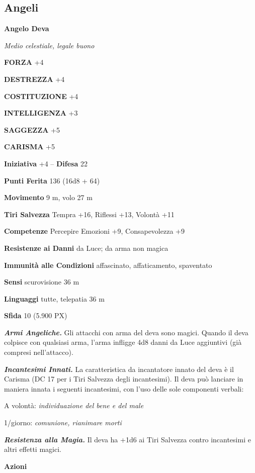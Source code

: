 \begin{multicols}{2}
	\subsection{Angeli}

	\medskip{}\textbf{Angelo Deva}

	\textit{Medio celestiale, legale buono}

	\textbf{FORZA} +4

	\textbf{DESTREZZA} +4

	\textbf{COSTITUZIONE} +4

	\textbf{INTELLIGENZA} +3

	\textbf{SAGGEZZA} +5

	\textbf{CARISMA} +5

	\textbf{Iniziativa} +4 -- \textbf{Difesa} 22

	\textbf{Punti Ferita} 136 (16d8 + 64)

	\textbf{Movimento} 9 m, volo 27 m

	\textbf{Tiri Salvezza} Tempra +16, Riflessi +13, Volontà +11

	\textbf{Competenze} Percepire Emozioni +9, Consapevolezza +9

	\textbf{Resistenze ai Danni} da Luce; da arma non magica

	\textbf{Immunità alle Condizioni} affascinato, affaticamento, spaventato

	\textbf{Sensi} scurovisione 36 m

	\textbf{Linguaggi} tutte, telepatia 36 m

	\textbf{Sfida} 10 (5.900 PX)

	\textit{\textbf{Armi Angeliche.}} Gli attacchi con arma del deva sono magici. Quando il deva colpisce con qualsiasi arma, l'arma infligge 4d8 danni da Luce aggiuntivi (già compresi nell'attacco).

	\textit{\textbf{Incantesimi Innati.}} La caratteristica da incantatore innato del deva è il Carisma (DC 17 per i Tiri Salvezza degli incantesimi). Il deva può lanciare in maniera innata i seguenti incantesimi, con l'uso delle sole componenti verbali:

	A volontà: \textit{individuazione del bene e del male}

	1/giorno: \textit{comunione, rianimare morti}

	\textit{\textbf{Resistenza alla Magia.}} Il deva ha +1d6 ai Tiri Salvezza contro incantesimi e altri effetti magici.

	\textbf{Azioni}


\end{multicols}
